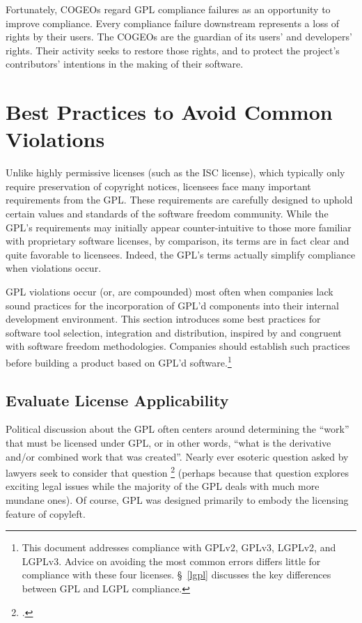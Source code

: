 Fortunately, COGEOs regard GPL compliance failures as an opportunity to
improve compliance.  Every compliance failure downstream represents a loss of
rights by their users. The COGEOs are the guardian of its users’ and
developers' rights.  Their activity seeks to restore those rights, and
to protect the project’s contributors’ intentions in the making of their
software. 

\chapter{Best Practices to Avoid Common Violations}
\label{best-practices}

Unlike highly permissive licenses (such as the ISC license), which
typically only require preservation of copyright notices, licensees face many
important requirements from the GPL.  These requirements are
carefully designed to uphold certain values and standards of the software
freedom community.  While the GPL's requirements may initially appear
counter-intuitive to those more familiar with proprietary software
licenses, by comparison, its terms are in fact clear and quite favorable to
licensees.  Indeed, the GPL's terms actually simplify compliance when
violations occur.

GPL violations occur (or, are compounded) most often when companies lack sound
practices for the incorporation of GPL'd components into their
internal development environment.  This section introduces some best
practices for software tool selection, integration and distribution,
inspired by and congruent with software freedom methodologies.  Companies should
establish such practices before building a product based on GPL'd
software.\footnote{This document addresses compliance with GPLv2,
  GPLv3, LGPLv2, and LGPLv3.  Advice on avoiding the most common
  errors differs little for compliance with these four licenses.
  \S~\ref{lgpl} discusses the key differences between GPL and LGPL
  compliance.}

\section{Evaluate License Applicability}
\label{derivative-works}
Political discussion about the GPL often centers around determining the
``work'' that must be licensed under GPL, or in other words, ``what is the
derivative and/or combined work that was created''.  Nearly ever esoteric
question asked by lawyers seek to consider that question
\footnote{.} (perhaps because
that question explores exciting legal issues while the majority of the GPL
deals with much more mundane ones).
Of course, GPL was designed
primarily to embody the licensing feature of copyleft.

